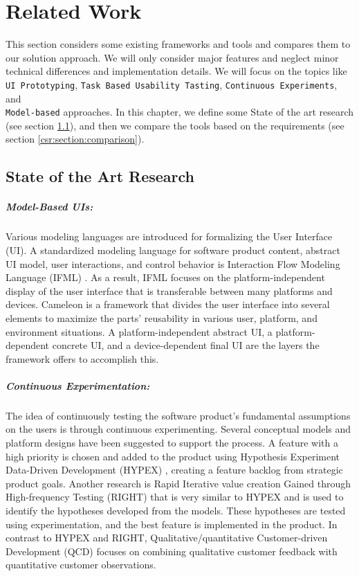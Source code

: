 \chapter{Related Work} \label{chap:csr}

This section considers some existing frameworks and tools and compares them to our solution approach. 
We will only consider major features and neglect minor technical differences and implementation details. 
We will focus on the topics like \texttt{UI Prototyping}, \texttt{Task Based Usability Tasting}, \texttt{Continuous Experiments}, and \\ \texttt{Model-based} approaches.
In this chapter, we define some State of the art research (see section \ref{csr:section:sotar}), and then we compare the tools based on the requirements (see section \ref{csr:section:comparison}). 

\section{State of the Art Research}
\label{csr:section:sotar}
\paragraph{Model-Based UIs:}
Various modeling languages are introduced for formalizing the User Interface (UI).
A standardized modeling language for software product content, abstract UI model, user interactions, and control behavior is Interaction Flow Modeling Language (IFML) \cite{article:ifml:piero}. 
As a result, IFML focuses on the platform-independent display of the user interface that is transferable between many platforms and devices.
Cameleon \cite{article:cameleon:balme} is a framework that divides the user interface into several elements to maximize the parts' reusability in various user, platform, and environment situations.
A platform-independent abstract UI, a platform-dependent concrete UI, and a device-dependent final UI are the layers the framework offers to accomplish this.

\paragraph{Continuous Experimentation:}
The idea of continuously testing the software product's fundamental assumptions on the users is through continuous experimenting.
Several conceptual models and platform designs have been suggested to support the process.
A feature with a high priority is chosen and added to the product using Hypothesis Experiment Data-Driven Development (HYPEX) \cite{article:hypex:model}, creating a feature backlog from strategic product goals.
Another research is Rapid Iterative value creation Gained through High-frequency Testing (RIGHT) \cite{article:right:model} that is very similar to HYPEX and is used to identify the hypotheses developed from the models.
These hypotheses are tested using experimentation, and the best feature is implemented in the product.
In contrast to HYPEX and RIGHT, Qualitative/quantitative Customer-driven Development (QCD) \cite{article:qq:helena} focuses on combining qualitative customer feedback with quantitative customer observations.  


